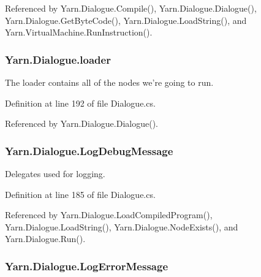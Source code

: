 Referenced by Yarn.\-Dialogue.\-Compile(), Yarn.\-Dialogue.\-Dialogue(), Yarn.\-Dialogue.\-Get\-Byte\-Code(), Yarn.\-Dialogue.\-Load\-String(), and Yarn.\-Virtual\-Machine.\-Run\-Instruction().

\hypertarget{a00086_a98bbe0ac2ccadeeeb7e05e3e6e19f2e0}{
\subsubsection[{loader}]{ Yarn.\-Dialogue.\-loader\hspace{0.3cm}{\ttfamily [package]}}}\label{a00086_a98bbe0ac2ccadeeeb7e05e3e6e19f2e0}


The loader contains all of the nodes we're going to run. 



Definition at line 192 of file Dialogue.\-cs.



Referenced by Yarn.\-Dialogue.\-Dialogue().

\hypertarget{a00086_a381f48bb0fbb294f8cf44ca57f11be31}{
\subsubsection[{Log\-Debug\-Message}]{ Yarn.\-Dialogue.\-Log\-Debug\-Message}}\label{a00086_a381f48bb0fbb294f8cf44ca57f11be31}


Delegates used for logging. 



Definition at line 185 of file Dialogue.\-cs.



Referenced by Yarn.\-Dialogue.\-Load\-Compiled\-Program(), Yarn.\-Dialogue.\-Load\-String(), Yarn.\-Dialogue.\-Node\-Exists(), and Yarn.\-Dialogue.\-Run().

\hypertarget{a00086_a9801e83dd044d6498fdf6ebcc6bec5ac}{
\subsubsection[{Log\-Error\-Message}]{ Yarn.\-Dialogue.\-Log\-Error\-Message}}\label{a00086_a9801e83dd044d6498fdf6ebcc6bec5ac}


